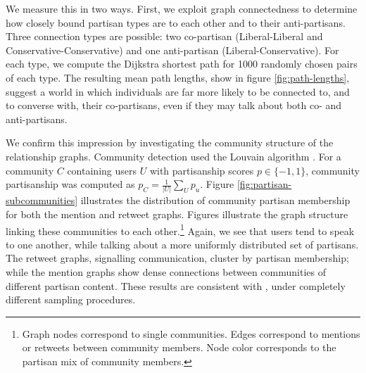 \documentclass{article}
\begin{document}
We measure this in two ways. First, we exploit graph connectedness to
determine how closely bound partisan types are to each other and to
their anti-partisans. Three connection types are possible: two
co-partisan (Liberal-Liberal and Conservative-Conservative) and one
anti-partisan (Liberal-Conservative). For each type, we compute the
Dijkstra shortest path for 1000 randomly chosen pairs of each
type. The resulting mean path lengths, show in figure
\ref{fig:path-lengths}, suggest a world in which individuals are far
more likely to be connected to, and to converse with, their
co-partisans, even if they may talk about both co- and anti-partisans.

We confirm this impression by investigating the community structure of
the relationship graphs. Community detection used the Louvain
algorithm \citep{blondel2008fast}. For a community $C$ containing
users $U$ with partisanship scores $p \in \{-1, 1\}$, community partisanship was computed
as $p_C = \frac{1}{\left|U\right|}\sum_U p_u$. Figure
\ref{fig:partisan-subcommunities} 
illustrates the distribution of community partisan membership
for both the mention and retweet graphs. Figures
 illustrate the graph
structure linking these communities to each other.\footnote{Graph
  nodes correspond to single communities. Edges correspond to mentions
or retweets between community members. Node color corresponds to the
partisan mix of community members.} Again, we see that users tend
to speak to one another, while talking about a more uniformly
distributed set of partisans. The retweet graphs, signalling
communication, cluster by partisan membership; while the mention
graphs show dense connections between communities of different
partisan content. These results are consistent with
\cite{conover2011}, under completely different sampling procedures. 



\end{document}

